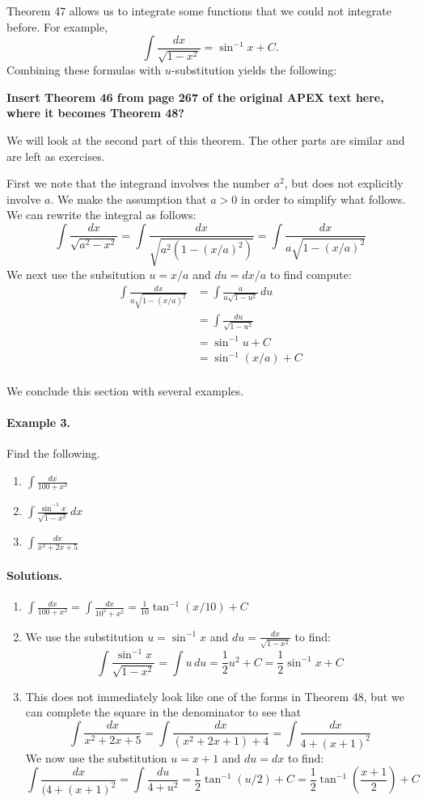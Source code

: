 \documentclass[12pt]{report}
\begin{document}
\begin{itemize}
{Theorem 47  allows us to integrate some functions that we could not integrate before. For example, \[\int\frac{dx}{\sqrt{1-x^2}}=\sin^{-1}x+C.\] Combining these formulas with $u$-substitution yields the following:

{\color{red} \bfseries Insert Theorem 46 from page 267 of the original APEX text here, where it becomes Theorem 48?}

We will look at the second part of this theorem. The other parts are similar and are left as exercises.

First we note that the integrand involves the number $a^2$, but does not explicitly involve $a$. We make the assumption that $a>0$ in order to simplify what follows. We can rewrite the integral as follows: \[ \int\frac{dx}{\sqrt{a^2-x^2}} =\int\frac{dx}{\sqrt{a^2(1-(x/a)^2)}}=\int\frac{dx}{a\sqrt{1-(x/a)^2}}\] We next use the subsitution $u=x/a$ and $du=dx/a$ to find compute: 
\begin{equation*}
\begin{split}
\int\frac{dx}{a\sqrt{1-(x/a)^2}} &=\int\frac{a}{a\sqrt{1-u^2}}\,du\\
&=\int \frac{du}{\sqrt{1-u^2}}\\
&=\sin^{-1}u+C\\
&=\sin^{-1}(x/a)+C\\
\end{split}
\end{equation*}

We conclude this section with several examples.

\paragraph{Example 3.} Find the following.
\begin{enumerate}
\item $\displaystyle\int\frac{dx}{100+x^2}$
\item $\displaystyle\int\frac{\sin^{-1} x}{\sqrt{1-x^2}}\,dx$
\item $\displaystyle\int\frac{dx}{x^2+2x+5}$
\end{enumerate}

\paragraph{Solutions.}
\begin{enumerate}
\item $\displaystyle \int \frac{dx}{100+x^2}=\int\frac{dx}{10^2+x^2} =\frac1{10}\tan^{-1}(x/10)+C$
\item We use the substitution $u=\sin^{-1}x$ and $du=\frac{dx}{\sqrt{1-x^2}}$ to find:
\[\int \frac{\sin^{-1}x}{\sqrt{1-x^2}} = \int u\,du =\frac 12 u^2+C=\frac 12 \sin^{-1}x+C\]
\item This does not immediately look like one of the forms in Theorem 48, but we can complete the square in the denominator to see that \[\int\frac{dx}{x^2+2x+5} =\int\frac{dx}{(x^2+2x+1)+4}=\int\frac{dx}{4+(x+1)^2}\] We now use the substitution $u=x+1$ and $du=dx$ to find: \[\int\frac{dx}{(4+(x+1)^2} =\int\frac{du}{4+u^2}=\frac12 \tan^{-1}(u/2)+C =\frac 12\tan^{-1}\left(\frac{x+1}2\right)+C\]
\end{enumerate}

}
\end{itemize}
\end{document}
